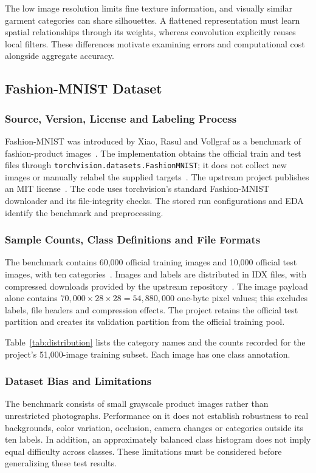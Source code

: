The low image resolution limits fine texture information, and visually similar garment categories can share silhouettes. A flattened representation must learn spatial relationships through its weights, whereas convolution explicitly reuses local filters. These differences motivate examining errors and computational cost alongside aggregate accuracy.

\subsection{Fashion-MNIST Dataset}
\subsubsection{Source, Version, License and Labeling Process}
Fashion-MNIST was introduced by Xiao, Rasul and Vollgraf as a benchmark of fashion-product images~\cite{fashionpaper}. The implementation obtains the official train and test files through \texttt{torchvision.datasets.FashionMNIST}; it does not collect new images or manually relabel the supplied targets~\cite{code}. The upstream project publishes an MIT license~\cite{fashionrepo}. The code uses torchvision's standard Fashion-MNIST downloader and its file-integrity checks. The stored run configurations and EDA identify the benchmark and preprocessing.

\subsubsection{Sample Counts, Class Definitions and File Formats}
The benchmark contains 60,000 official training images and 10,000 official test images, with ten categories~\cite{fashionpaper}. Images and labels are distributed in IDX files, with compressed downloads provided by the upstream repository~\cite{fashionrepo}. The image payload alone contains $70{,}000\times28\times28=54{,}880{,}000$ one-byte pixel values; this excludes labels, file headers and compression effects. The project retains the official test partition and creates its validation partition from the official training pool.

Table~\ref{tab:distribution} lists the category names and the counts recorded for the project's 51,000-image training subset. Each image has one class annotation.

\subsubsection{Dataset Bias and Limitations}
The benchmark consists of small grayscale product images rather than unrestricted photographs. Performance on it does not establish robustness to real backgrounds, color variation, occlusion, camera changes or categories outside its ten labels. In addition, an approximately balanced class histogram does not imply equal difficulty across classes. These limitations must be considered before generalizing these test results.

